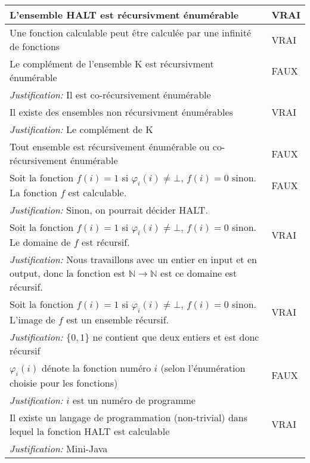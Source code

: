 \begin{longtable}{p{13cm}|l}
    L'ensemble HALT est récursivment énumérable & VRAI \\
    \hline
    Une fonction calculable peut être calculée par une infinité de fonctions & VRAI \\
    \hline
    Le complément de l'ensemble K est récursivment énumérable & FAUX \\
    \textit{Justification:} Il est co-récursivement énumérable \\
    \hline
    Il existe des ensembles non récursivment énumérables & VRAI \\
    \textit{Justification:} Le complément de K & \\
    \hline
    Tout ensemble est récursivement énumérable ou co-récursivement énumérable & FAUX \\
    \hline
    Soit la fonction $f(i) = 1$ si $\varphi_{i}(i) \neq \bot$, $f(i) = 0$ sinon. La fonction $f$ est calculable. & FAUX \\
    \textit{Justification:} Sinon, on pourrait décider HALT. & \\
    \hline
    Soit la fonction $f(i) = 1$ si $\varphi_{i}(i) \neq \bot$, $f(i) = 0$ sinon. Le domaine de $f$ est récursif. & VRAI \\
    \textit{Justification:} Nous travaillons avec un entier en input et en output, donc la fonction est $\mathbb{N} \rightarrow \mathbb{N}$ est ce domaine est récursif. & \\
    \hline
    Soit la fonction $f(i) = 1$ si $\varphi_{i}(i) \neq \bot$, $f(i) = 0$ sinon. L'image de $f$ est un ensemble récursif. & VRAI \\
    \textit{Justification:} $\{0,1\}$ ne contient que deux entiers et est donc récursif &  \\
    \hline
    $\varphi_{i}(i)$ dénote la fonction numéro $i$ (selon l'énumération choisie pour les fonctions) & FAUX \\
    \textit{Justification:} $i$ est un numéro de programme & \\
    \hline
    Il existe un langage de programmation (non-trivial) dans lequel la fonction HALT est calculable & VRAI \\
     \textit{Justification:} Mini-Java  \\

\end{longtable}
